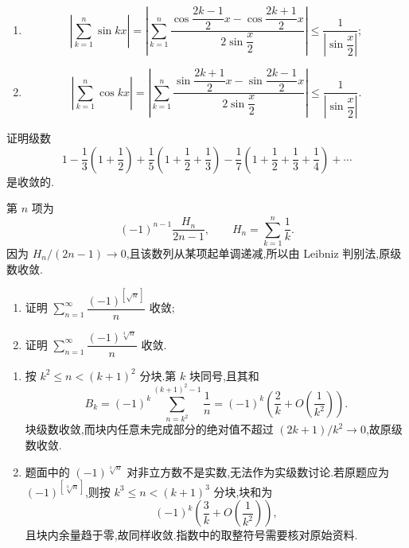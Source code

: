 \begin{proposition}[\markstar]
    \leavevmode
    \begin{enumerate}
        \item
              \[
                  \left|\sum\limits_{k=1}^n\sin kx\right|
                  =\left|\sum\limits_{k=1}^n
                  \dfrac{\cos\dfrac{2k-1}{2}x-\cos\dfrac{2k+1}{2}x}{2\sin\dfrac{x}{2}}\right|
                  \leq\dfrac{1}{|\sin\dfrac{x}{2}|};
              \]
        \item
              \[
                  \left|\sum\limits_{k=1}^n\cos kx\right|
                  =\left|\sum\limits_{k=1}^n
                  \dfrac{\sin\dfrac{2k+1}{2}x-\sin\dfrac{2k-1}{2}x}{2\sin\dfrac{x}{2}}\right|
                  \leq\dfrac{1}{|\sin\dfrac{x}{2}|}.
              \]
    \end{enumerate}
\end{proposition}

\begin{example}
    证明级数
    \[
        1-\dfrac{1}{3}\left(1+\dfrac{1}{2}\right)
        +\dfrac{1}{5}\left(1+\dfrac{1}{2}+\dfrac{1}{3}\right)
        -\dfrac{1}{7}\left(1+\dfrac{1}{2}+\dfrac{1}{3}+\dfrac{1}{4}\right)+\cdots
    \]
    是收敛的.
\end{example}
\exampleblank

\begin{solution}
    第 $n$ 项为
    \[
        (-1)^{n-1}\dfrac{H_n}{2n-1},
        \qquad H_n=\sum\limits_{k=1}^{n}\dfrac{1}{k}.
    \]
    因为 $H_n/(2n-1)\to0$,且该数列从某项起单调递减,所以由 Leibniz 判别法,原级数收敛.
\end{solution}

\begin{example}[\markstar]
    \begin{enumerate}
        \item 证明 $\displaystyle\sum\limits_{n=1}^{\infty}\dfrac{(-1)^{[\sqrt n]}}{n}$ 收敛;
        \item 证明 $\displaystyle\sum\limits_{n=1}^{\infty}\dfrac{(-1)^{\sqrt[3]{n}}}{n}$ 收敛.
    \end{enumerate}
\end{example}
\exampleblank

\begin{solution}
    \leavevmode
    \begin{enumerate}
        \item 按 $k^2\leq n<(k+1)^2$ 分块.第 $k$ 块同号,且其和
              \[
                  B_k=(-1)^k\sum\limits_{n=k^2}^{(k+1)^2-1}\dfrac{1}{n}
                  =(-1)^k\left(\dfrac{2}{k}+O\left(\dfrac{1}{k^2}\right)\right).
              \]
              块级数收敛,而块内任意未完成部分的绝对值不超过 $(2k+1)/k^2\to0$,故原级数收敛.
        \item 题面中的 $(-1)^{\sqrt[3]n}$ 对非立方数不是实数,无法作为实级数讨论.若原题应为
              $(-1)^{[\sqrt[3]n]}$,则按 $k^3\leq n<(k+1)^3$ 分块,块和为
              \[
                  (-1)^k\left(\dfrac{3}{k}+O\left(\dfrac{1}{k^2}\right)\right),
              \]
              且块内余量趋于零,故同样收敛.指数中的取整符号需要核对原始资料.
    \end{enumerate}
\end{solution}

